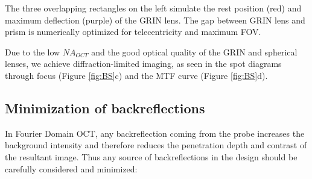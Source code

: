The three overlapping rectangles on the left simulate the rest position (red) and maximum deflection (purple) of the GRIN lens. The gap between GRIN lens and prism is numerically optimized for telecentricity and maximum FOV.

	Due to the low $\mathit{NA_{OCT}}$ and the good optical quality of the GRIN and spherical lenses, we achieve diffraction-limited imaging, as seen in the spot diagrams through focus (Figure \ref{fig:BS}c) and the MTF curve (Figure \ref{fig:BS}d).


\subsection*{Minimization of backreflections}
In Fourier Domain OCT, any backreflection coming from the probe increases the background intensity and therefore reduces the penetration depth and contrast of the resultant image. Thus any source of backreflections in the design should be carefully considered and minimized:

